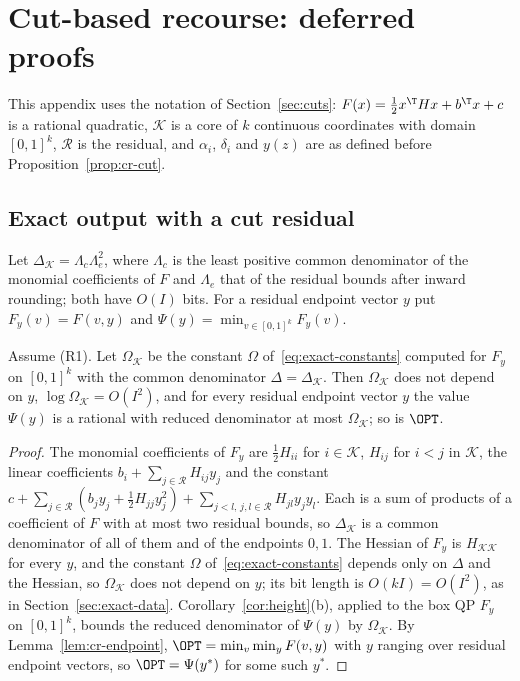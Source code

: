 \section{Cut-based recourse: deferred proofs}\label{app:recourse-cuts}

This appendix uses the notation of Section~\ref{sec:cuts}:
$F(x)=\frac12x^{\T}Hx+b^{\T}x+c$ is a rational quadratic, $\mathcal K$ is a
core of $k$ continuous coordinates with domain $[0,1]^k$, $\mathcal R$ is the
residual, and $\alpha_i$, $\delta_i$ and $y(z)$ are as defined before
Proposition~\ref{prop:cr-cut}.

\subsection{Exact output with a cut residual}

Let $\Delta_{\mathcal K}=\Lambda_c\Lambda_e^2$, where $\Lambda_c$ is the
least positive common denominator of the monomial coefficients of $F$ and
$\Lambda_e$ that of the residual bounds after inward rounding; both have
$O(I)$ bits. For a residual
endpoint vector $y$ put $F_y(v)=F(v,y)$ and
$\Psi(y)=\min_{v\in[0,1]^k}F_y(v)$.

\begin{lemma}\label{lem:cr-height}
Assume (R1). Let $\Omega_{\mathcal K}$ be the constant $\Omega$
of~\eqref{eq:exact-constants} computed for $F_y$ on $[0,1]^k$ with the
common denominator $\Delta=\Delta_{\mathcal K}$. Then $\Omega_{\mathcal K}$
does not depend on $y$, $\log\Omega_{\mathcal K}=O(I^2)$, and for every
residual endpoint vector $y$ the value $\Psi(y)$ is a rational with reduced
denominator at most $\Omega_{\mathcal K}$; so is $\OPT$.
\end{lemma}

\begin{proof}
The monomial coefficients of $F_y$ are $\frac12H_{ii}$ for $i\in\mathcal K$,
$H_{ij}$ for $i<j$ in $\mathcal K$, the linear coefficients
$b_i+\sum_{j\in\mathcal R}H_{ij}y_j$ and the constant
$c+\sum_{j\in\mathcal R}(b_jy_j+\frac12H_{jj}y_j^2)
+\sum_{j<l,\,j,l\in\mathcal R}H_{jl}y_jy_l$. Each is a sum of products of a
coefficient of $F$ with at most two residual bounds, so $\Delta_{\mathcal K}$
is a common denominator of all of them and of the endpoints $0,1$. The
Hessian of $F_y$ is $H_{\mathcal K\mathcal K}$ for every $y$, and the
constant $\Omega$ of~\eqref{eq:exact-constants} depends only on $\Delta$ and
the Hessian, so $\Omega_{\mathcal K}$ does not depend on $y$; its bit
length is $O(kI)=O(I^2)$, as in Section~\ref{sec:exact-data}.
Corollary~\ref{cor:height}(b), applied to the box QP $F_y$ on
$[0,1]^k$, bounds the reduced denominator of $\Psi(y)$ by
$\Omega_{\mathcal K}$. By Lemma~\ref{lem:cr-endpoint},
$\OPT=\min_v\min_{y}F(v,y)$ with $y$ ranging over residual endpoint vectors,
so $\OPT=\Psi(y^*)$ for some such $y^*$.
\end{proof}

